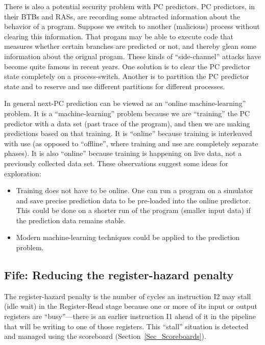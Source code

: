 There is also a potential security problem with PC predictors.  PC
predictors, in their BTBs and RASs, are recording some abtracted
information about the behavior of a program.  Suppose we switch to
another (malicious) process without clearing this information. That
progam may be able to execute code that measures whether certain
branches are predicted or not, and thereby glean some information
about the orignal progam.  These kinds of ``side-channel'' attacks
have become quite famous in recent years.  One solution is to clear
the PC predictor state completely on a process-switch.  Another is to
partition the PC predictor state and to reserve and use different
partitions for different processes.

In general next-PC prediction can be viewed as an ``online
machine-learning'' problem.  It is a ``machine-learning'' problem
because we are ``training'' the PC predictor with a data set (past
trace of the program), and then we are making predictions based on
that training.  It is ``online'' because training is interleaved with
use (as opposed to ``offline'', where training and use are completely
separate phases).  It is also ``online'' because training is happening
on live data, not a previously collected data set.  These observations
suggest some ideas for exploration:

\begin{itemize}

 \item Training does not have to be online.  One can run a program on
       a simulator and save precise prediction data to be pre-loaded
       into the online predictor.  This could be done on a shorter run
       of the program (smaller input data) if the prediction data
       remains stable.

 \item Modern machine-learning techniques could be applied to the
       prediction problem.

\end{itemize}


\subsection{Fife: Reducing the register-hazard penalty}

\label{Sec_Reducing_Hazards}

The register-hazard penalty is the number of cycles an instruction I2
may stall (idle wait) in the Register-Read stage because one or more
of its input or output registers are ``busy''---there is an earlier
instruction I1 ahead of it in the pipeline that will be writing to one
of those registers.  This ``stall'' situation is detected and managed
using the scoreboard (Section~\ref{Sec_Scoreboards}).

